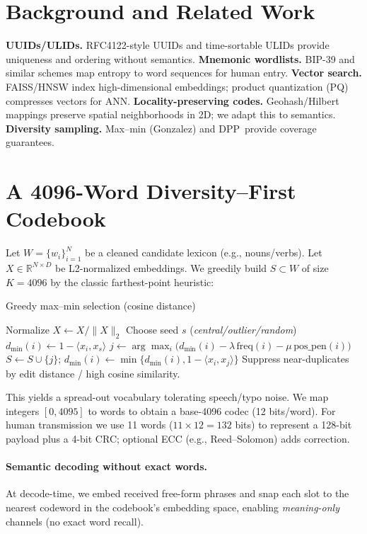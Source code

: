\documentclass[11pt]{article}
\newcommand{\pq}{\textsc{PQ}}
\newcommand{\dpp}{\textsc{DPP}}
\begin{document}
\section{Background and Related Work}
\textbf{UUIDs/ULIDs.} RFC4122-style UUIDs and time-sortable ULIDs provide uniqueness and ordering without semantics. \textbf{Mnemonic wordlists.} BIP-39 and similar schemes map entropy to word sequences for human entry. \textbf{Vector search.} FAISS/HNSW index high-dimensional embeddings; product quantization (\pq) compresses vectors for ANN. \textbf{Locality-preserving codes.} Geohash/Hilbert mappings preserve spatial neighborhoods in 2D; we adapt this to semantics. \textbf{Diversity sampling.} Max--min (Gonzalez) and \dpp\ provide coverage guarantees.

\section{A 4096-Word Diversity--First Codebook}
\label{sec:codebook}
Let $W=\{w_i\}_{i=1}^N$ be a cleaned candidate lexicon (e.g., nouns/verbs). Let $X\in\mathbb{R}^{N\times D}$ be L2-normalized embeddings. We greedily build $S\subset W$ of size $K{=}4096$ by the classic farthest-point heuristic:

\begin{algorithm}[H]
\caption{Greedy max--min selection (cosine distance)}
\begin{algorithmic}[1]
\State Normalize $X \gets X / \|X\|_2$
\State Choose seed $s$ (\emph{central/outlier/random})
\State $d_{\min}(i)\gets 1{-}\langle x_i, x_s\rangle$
  \State $j \gets \arg\max_i \big( d_{\min}(i) - \lambda\, \text{freq}(i) - \mu\, \text{pos\_pen}(i) \big)$
  \State $S\gets S\cup\{j\}$; \quad $d_{\min}(i)\gets \min\{d_{\min}(i), 1{-}\langle x_i,x_j\rangle\}$
  \State Suppress near-duplicates by edit distance / high cosine similarity.
\EndFor
\end{algorithmic}
\end{algorithm}

This yields a spread-out vocabulary tolerating speech/typo noise. We map integers $[0,4095]$ to words to obtain a base-4096 codec (12 bits/word). For human transmission we use 11 words ($11{\times}12=132$ bits) to represent a 128-bit payload plus a 4-bit CRC; optional ECC (e.g., Reed--Solomon) adds correction.

\paragraph{Semantic decoding without exact words.}
At decode-time, we embed received free-form phrases and snap each slot to the nearest codeword in the codebook's embedding space, enabling \emph{meaning-only} channels (no exact word recall).
\end{document}
